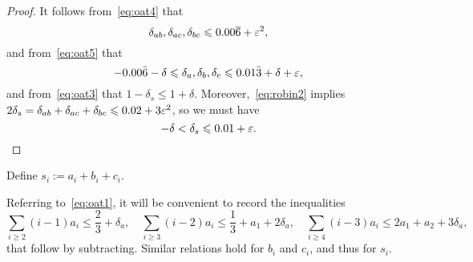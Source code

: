 \begin{proof}
  \leanok
  It follows from~\eqref{eq:oat4} that
  \begin{equation*}
  \delta_{ab}, \delta_{ac}, \delta_{bc} \leqslant 0.00\overline{6} + \varepsilon^2,
  \end{equation*}
  and from~\eqref{eq:oat5} that
  \begin{equation*}
  -0.00\bar 6 - \delta
  \leqslant \delta_a,\delta_b,\delta_c \leqslant
  0.01\bar3+\delta+\varepsilon,
  \end{equation*}
  and from~\eqref{eq:oat3} that
  $1-\delta_s\leq 1+\delta. $
  Moreover,~\eqref{eq:robin2} implies $2\delta_s = \delta_{ab}+ \delta_{ac}+ \delta_{bc}\leqslant 0.02 + 3\varepsilon^2$, so we must have
  \begin{equation*}
    -\delta < \delta_s \leqslant 0.01+\varepsilon.
  \end{equation*}
\end{proof}

\begin{definition}\label{def:s}
  \leanok
  Define $s_i := a_i + b_i + c_i$.
\end{definition}

Referring to~\eqref{eq:oat1}, it will be convenient to record the inequalities
\begin{equation}\label{eq:ai}
  \sum_{i\ge2} (i-1)a_i \le \frac{2}{3}+\delta_a, \quad \sum_{i\ge3} (i-2)a_i\le\frac{1}{3}+a_1 + 2\delta_a, \quad
  \sum_{i\ge4}(i-3)a_i \le 2a_1+a_2+3\delta_a,
\end{equation}
that follow by subtracting. Similar relations hold for $b_i$ and $c_i$, and thus for $s_i$.


